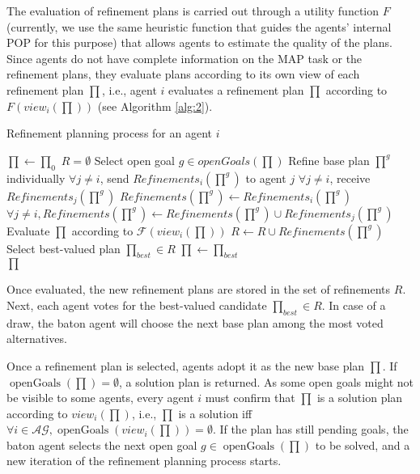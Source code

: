 \documentclass[12pt]{article}
\DeclareMathOperator{\openGoals}{openGoals}
\begin{document}
The evaluation of refinement plans is carried out through a utility function $F$ (currently, we use the same heuristic function that guides the agents' internal POP for this purpose) that allows agents to estimate the quality of the plans.
Since agents do not have complete information on the MAP task or the refinement plans, they evaluate plans according to its own view of each refinement plan $\prod$, i.e., agent $i$ evaluates a refinement plan $\prod$ according to $F(view_i(\prod))$ (see Algorithm \ref{alg:2}).

\begin{algorithm}
\caption{Refinement planning process for an agent $i$}
\label{alg:2}
  \begin{algorithmic}
    \State $\prod \leftarrow \prod_0$
    \State $R = \emptyset$
    \Repeat
      \State Select open goal $g \in openGoals(\prod)$
      \State Refine base plan $\prod^g$ individually
      \State $\forall j \neq i$, send $Refinements_i(\prod^g)$ to agent $j$
      \State $\forall j \neq i$, receive $Refinements_j(\prod^g)$
      \State $Refinements(\prod^g) \leftarrow Refinements_i(\prod^g)$
      \State $\forall j \neq i, Refinements(\prod^g) \leftarrow Refinements(\prod^g) \cup Refinements_j(\prod^g)$
        \State Evaluate $\prod$ according to $\mathcal{F}(view_i(\prod))$
      \EndFor
      \State $R \leftarrow R \cup Refinements(\prod^g)$
      \State Select best-valued plan $\prod_{best} \in R$
      \State $\prod \leftarrow \prod_{best}$
      \If{$\openGoals(\prod) = \emptyset$}\\
        \hspace{\algorithmicindent}\hspace{\algorithmicindent}\Return $\prod$
      \EndIf
  \end{algorithmic}
\end{algorithm}

Once evaluated, the new refinement plans are stored in the set of refinements $R$.
Next, each agent votes for the best-valued candidate $\prod_{best} \in R$.
In case of a draw, the baton agent will choose the next base plan among the most voted alternatives.

Once a refinement plan is selected, agents adopt it as the new base plan $\prod$.
If $\openGoals(\prod) = \emptyset$, a solution plan is returned.
As some open goals might not be visible to some agents, every agent $i$ must confirm that $\prod$ is a solution plan according to $view_i(\prod)$, i.e., $\prod$ is a solution iff $\forall i \in \mathcal{AG}, \openGoals(view_i(\prod)) = \emptyset$.
If the plan has still pending goals, the baton agent selects the next open goal $g \in \openGoals(\prod)$ to be solved, and a new iteration of the refinement planning process starts.
\end{document}
